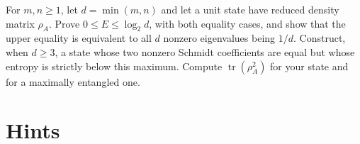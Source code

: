 \begin{exercise}[$\star\star$]\label{ex:v10new-ch02-entropy-equality}
For $m,n\ge1$, let $d=\min(m,n)$ and let a unit state have reduced density matrix $\rho_A$. Prove $0\le E\le\log_2d$, with both equality cases, and show that the upper equality is equivalent to all $d$ nonzero eigenvalues being $1/d$. Construct, when $d\ge3$, a state whose two nonzero Schmidt coefficients are equal but whose entropy is strictly below this maximum. Compute $\operatorname{tr}(\rho_A^2)$ for your state and for a maximally entangled one.
\end{exercise}

\section{Hints}

